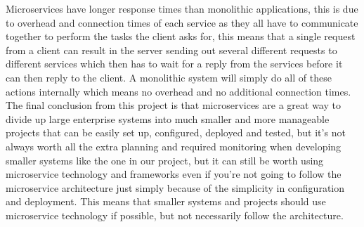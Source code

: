 Microservices have longer response times than monolithic applications, this is due to overhead and connection times of each service as they all have to communicate together to perform the tasks the client asks for, this means that a single request from a client can result in the server sending out several different requests to different services which then has to wait for a reply from the services before it can then reply to the client. A monolithic system will simply do all of these actions internally which means no overhead and no additional connection times.\\

The final conclusion from this project is that microservices are a great way to divide up large enterprise systems into much smaller and more manageable projects that can be easily set up, configured, deployed and tested, but it’s not always worth all the extra planning and required monitoring when developing smaller systems like the one in our project, but it can still be worth using microservice technology and frameworks even if you’re not going to follow the microservice architecture just simply because of the simplicity in configuration and deployment. This means that smaller systems and projects should use microservice technology if possible, but not necessarily follow the architecture.\\
